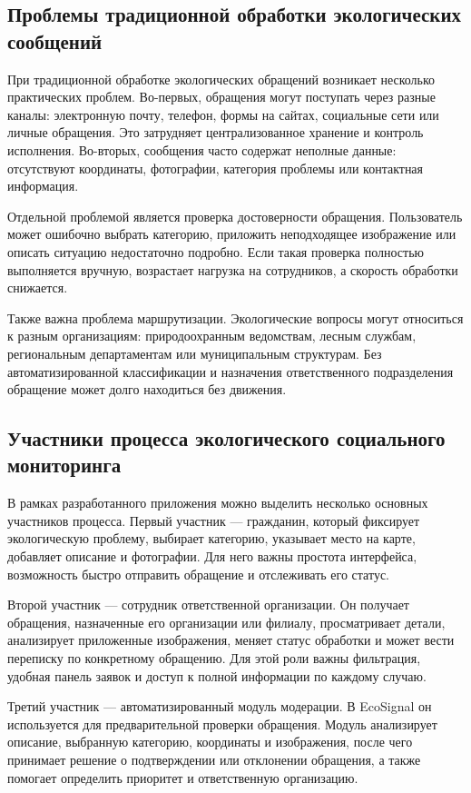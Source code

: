 \documentclass[14pt,a4paper]{extarticle}
\begin{document}
\subsection{Проблемы традиционной обработки экологических сообщений}

При традиционной обработке экологических обращений возникает несколько практических проблем. Во-первых, обращения могут поступать через разные каналы: электронную почту, телефон, формы на сайтах, социальные сети или личные обращения. Это затрудняет централизованное хранение и контроль исполнения. Во-вторых, сообщения часто содержат неполные данные: отсутствуют координаты, фотографии, категория проблемы или контактная информация.

Отдельной проблемой является проверка достоверности обращения. Пользователь может ошибочно выбрать категорию, приложить неподходящее изображение или описать ситуацию недостаточно подробно. Если такая проверка полностью выполняется вручную, возрастает нагрузка на сотрудников, а скорость обработки снижается.

Также важна проблема маршрутизации. Экологические вопросы могут относиться к разным организациям: природоохранным ведомствам, лесным службам, региональным департаментам или муниципальным структурам. Без автоматизированной классификации и назначения ответственного подразделения обращение может долго находиться без движения.

\subsection{Участники процесса экологического социального мониторинга}

В рамках разработанного приложения можно выделить несколько основных участников процесса. Первый участник --- гражданин, который фиксирует экологическую проблему, выбирает категорию, указывает место на карте, добавляет описание и фотографии. Для него важны простота интерфейса, возможность быстро отправить обращение и отслеживать его статус.

Второй участник --- сотрудник ответственной организации. Он получает обращения, назначенные его организации или филиалу, просматривает детали, анализирует приложенные изображения, меняет статус обработки и может вести переписку по конкретному обращению. Для этой роли важны фильтрация, удобная панель заявок и доступ к полной информации по каждому случаю.

Третий участник --- автоматизированный модуль модерации. В EcoSignal он используется для предварительной проверки обращения. Модуль анализирует описание, выбранную категорию, координаты и изображения, после чего принимает решение о подтверждении или отклонении обращения, а также помогает определить приоритет и ответственную организацию.
\end{document}
